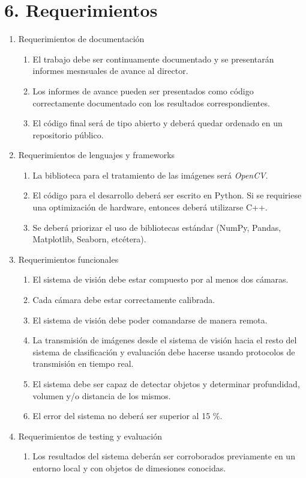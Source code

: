 \documentclass[
11pt, %
]{charter}
\begin{document}
\section{6. Requerimientos}
\label{sec:requerimientos}

\begin{enumerate}
	\item Requerimientos de documentación
		\begin{enumerate}
			\item El trabajo debe ser continuamente documentado y se presentarán informes mesnsuales de avance al director.
			\item Los informes de avance pueden ser presentados como código correctamente documentado con los resultados correspondientes.
			\item El código final será de tipo abierto y deberá quedar ordenado en un repositorio público.
		\end{enumerate}
	\item Requerimientos de lenguajes y frameworks
		\begin{enumerate}
			\item La biblioteca para el tratamiento de las imágenes será \emph{OpenCV}.
			\item El código para el desarrollo deberá ser escrito en Python. Si se requiriese una optimización de hardware, entonces deberá utilizarse C++.
			\item Se deberá priorizar el uso de bibliotecas estándar  (NumPy, Pandas, Matplotlib, Seaborn, etcétera).
		\end{enumerate}
	\item Requerimientos funcionales
		\begin{enumerate}
			\item El sistema de visión debe estar compuesto por al menos dos cámaras.
			\item Cada cámara debe estar correctamente calibrada.
			\item El sistema de visión debe poder comandarse de manera remota.
			\item La transmisión de imágenes desde el sistema de visión hacia el resto del sistema de clasificación y evaluación debe hacerse usando protocolos de transmisión en tiempo real.
			\item El sistema debe ser capaz de detectar objetos y determinar profundidad, volumen y/o distancia de los mismos.
			\item El error del sistema no deberá ser superior al 15 \%.
		\end{enumerate}
	\item Requerimientos de testing y evaluación
		\begin{enumerate}
			\item Los resultados del sistema deberán ser corroborados previamente en un entorno local y con objetos de dimesiones conocidas.
		\end{enumerate}
\end{enumerate}
\end{document}
